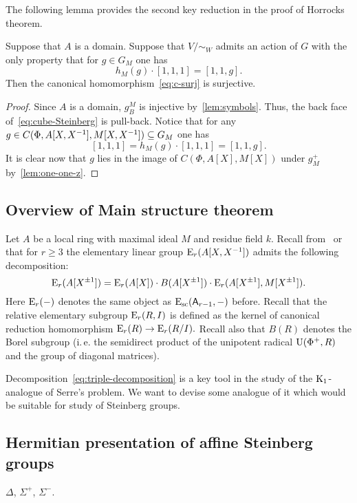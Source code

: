 The following lemma provides the second key reduction in the proof of Horrocks theorem.
\begin{lemma}
    Suppose that $A$ is a domain.
    Suppose that $V/\sim_W$ admits an action of $G$ with the only property that
      for $g \in G_M$ one has \[ h_M(g) \cdot [1, 1, 1] = [1, 1, g]. \]
    Then the canonical homomorphism~\eqref{eq:c-surj} is surjective.
\end{lemma}
\begin{proof}
  Since $A$ is a domain, $g^M_B$ is injective by~\cref{lem:symbols}.
    Thus, the back face of~\eqref{eq:cube-Steinberg} is pull-back.
  Notice that for any $g \in C(\Phi, A[X, X^{-1}], M[X, X^{-1}]) \subseteq G_M$ one has
    \[ [1, 1, 1] = h_M(g) \cdot [1, 1, 1] = [1, 1, g].\]
  It is clear now that $g$ lies in the image of $C(\Phi, A[X], M[X])$ under $g^+_M$ by~\cref{lem:one-one-z}.
\end{proof}

\subsection{Overview of Main structure theorem}

Let $A$ be a local ring with maximal ideal $M$ and residue field $k$.
Recall from~\cite[\S~4]{Su77} or~\cite[\S~VI.6]{Lam10} that for $r \geq 3$ the elementary linear group $\operatorname{E}_r(A[X, X^{-1}])$ admits the following decomposition:
\begin{equation}\label{eq:triple-decomposition}
\operatorname{E}_r(A[X^{\pm 1}]) = \operatorname{E}_r(A[X]) \cdot B(A[X^{\pm 1}]) \cdot \operatorname{E}_r(A[X^{\pm 1}], M[X^{\pm 1}]).
\end{equation}
Here $\operatorname{E}_r(-)$ denotes the same object as $\operatorname{E}_\mathrm{sc}(\mathsf{A}_{r - 1}, -)$ before.
Recall that the relative elementary subgroup $\operatorname{E}_r(R, I)$ is defined as the kernel of canonical reduction homomorphism $\operatorname{E}_r(R) \to \operatorname{E}_r(R/I).$
Recall also that $B(R)$ denotes the Borel subgroup (i.\,e. the semidirect product of the unipotent radical $\operatorname{U}(\Phi^+, R)$ and the group of diagonal matrices).

Decomposition~\eqref{eq:triple-decomposition} is a key tool in the study of the {$\operatorname{K}_1$-analogue of Serre's problem}.
We want to devise some analogue of it which would be suitable for study of Steinberg groups.

\subsection{Hermitian presentation of affine Steinberg groups}
$\Delta$, $\Sigma^+$, $\Sigma^-$.

